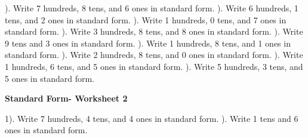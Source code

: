 \documentclass{article}%
\begin{document}
\newline%
). Write 7 hundreds, 8 tens, and 6 ones in standard form.%
\newline%
\newline%
). Write 6 hundreds, 1 tens, and 2 ones in standard form.%
\newline%
\newline%
). Write 1 hundreds, 0 tens, and 7 ones in standard form.%
\newline%
\newline%
). Write 3 hundreds, 8 tens, and 8 ones in standard form.%
\newline%
\newline%
). Write 9 tens and 3 ones in standard form.%
\newline%
\newline%
). Write 1 hundreds, 8 tens, and 1 ones in standard form.%
\newline%
\newline%
). Write 2 hundreds, 8 tens, and 0 ones in standard form.%
\newline%
\newline%
). Write 1 hundreds, 6 tens, and 5 ones in standard form.%
\newline%
\newline%
). Write 5 hundreds, 3 tens, and 5 ones in standard form.%
\newline%
\newline%
\newline%
\pagebreak%
\large%
\begin{center}%
\textbf{Standard Form- Worksheet 2}%
\newline%
\end{center} \normalsize%
1). Write 7 hundreds, 4 tens, and 4 ones in standard form.%
\newline%
\newline%
). Write 1 tens and 6 ones in standard form.%
\newline%
\newline%
\newline%
\end{document}
